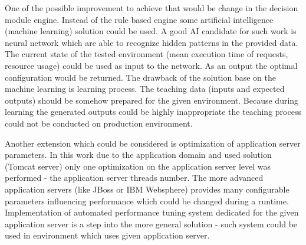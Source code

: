 \documentclass[12pt,a4paper]{article}
\begin{document}
One of the possible improvement to achieve that would be change in the decision module engine. Instead of the rule based engine some artificial intelligence (machine learning) solution could be used. A good AI candidate for such work is neural network which are able to recognize hidden patterns in the provided data. The current state of the tested environment (mean execution time of requests, resource usage) could be used as input to the network. As an output the optimal configuration would be returned. The drawback of the solution base on the machine learning is learning process. The teaching data (inputs and expected outputs) should be somehow prepared for the given environment. Because during learning the generated outputs could be highly inappropriate the teaching process could not be conducted on production environment.

Another extension which could be considered is optimization of application server parameters. In this work due to the application domain and used solution (Tomcat server) only one optimization on the application server level was performed - the application server threads number. The more advanced application servers (like JBoss or IBM Websphere) provides many configurable parameters influencing performance which could be changed during a runtime. Implementation of automated performance tuning system dedicated for the given application server is a step into the more general solution - such system could be used in environment which uses given application server.  

\pagebreak
\clearpage
\end{document}
